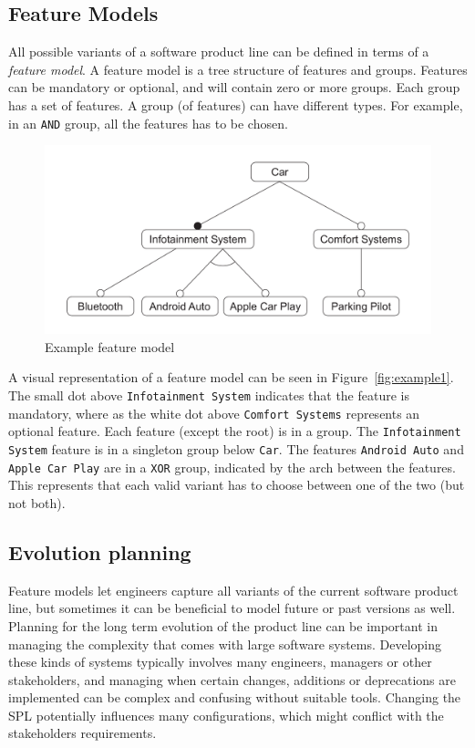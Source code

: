 \documentclass[a4paper,english]{ifimaster}
\begin{document}
\subsection{Feature Models}%
\label{sub:feature_models}

All possible variants of a software product line can be defined in terms of a \textit{feature model}. A feature model is a tree structure of features and groups. Features can be mandatory or optional, and will contain zero or more groups. Each group has a set of features. A group (of features) can have different types. For example, in an \texttt{AND} group, all the features has to be chosen.

\begin{figure}[htpb]
	\centering
	\includegraphics[width=0.8\linewidth]{illustrations/example.pdf}
	\caption{Example feature model}%
	\label{fig:example1}
\end{figure}

A visual representation of a feature model can be seen in Figure~\vref{fig:example1}. The small dot above \texttt{Infotainment System} indicates that the feature is mandatory, where as the white dot above \texttt{Comfort Systems} represents an optional feature. Each feature (except the root) is in a group. The \texttt{Infotainment System} feature is in a singleton group below \texttt{Car}. The features \texttt{Android Auto} and \texttt{Apple Car Play} are in a \texttt{XOR} group, indicated by the arch between the features. This represents that each valid variant has to choose between one of the two (but not both).

\subsection{Evolution planning}%
\label{sub:evolution_planning}

Feature models let engineers capture all variants of the current software product line, but sometimes it can be beneficial to model future or past versions as well. Planning for the long term evolution of the product line can be important in managing the complexity that comes with large software systems. Developing these kinds of systems typically involves many engineers, managers or other stakeholders, and managing when certain changes, additions or deprecations are implemented can be complex and confusing without suitable tools. Changing the SPL potentially influences many configurations, which might conflict with the stakeholders requirements.
\end{document}
